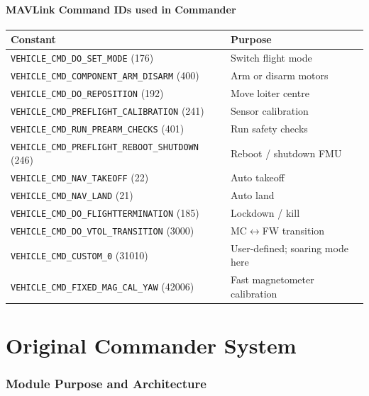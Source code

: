 \documentclass[12pt,a4paper]{article}
\begin{document}
\subsection*{MAVLink Command IDs used in Commander}
\begin{center}\begin{tabular}{ll}\toprule
Constant & Purpose \\\midrule
\texttt{VEHICLE\_CMD\_DO\_SET\_MODE} (176) & Switch flight mode \\
\texttt{VEHICLE\_CMD\_COMPONENT\_ARM\_DISARM} (400) & Arm or disarm motors \\
\texttt{VEHICLE\_CMD\_DO\_REPOSITION} (192) & Move loiter centre \\
\texttt{VEHICLE\_CMD\_PREFLIGHT\_CALIBRATION} (241) & Sensor calibration \\
\texttt{VEHICLE\_CMD\_RUN\_PREARM\_CHECKS} (401) & Run safety checks \\
\texttt{VEHICLE\_CMD\_PREFLIGHT\_REBOOT\_SHUTDOWN} (246) & Reboot / shutdown FMU \\
\texttt{VEHICLE\_CMD\_NAV\_TAKEOFF} (22) & Auto takeoff \\
\texttt{VEHICLE\_CMD\_NAV\_LAND} (21) & Auto land \\
\texttt{VEHICLE\_CMD\_DO\_FLIGHTTERMINATION} (185) & Lockdown / kill \\
\texttt{VEHICLE\_CMD\_DO\_VTOL\_TRANSITION} (3000) & MC$\leftrightarrow$FW transition \\
\texttt{VEHICLE\_CMD\_CUSTOM\_0} (31010) & User-defined; soaring mode here \\
\texttt{VEHICLE\_CMD\_FIXED\_MAG\_CAL\_YAW} (42006) & Fast magnetometer calibration \\
\bottomrule\end{tabular}\end{center}

\newpage
\part{Original Commander System}

\section{Module Purpose and Architecture}
\end{document}

